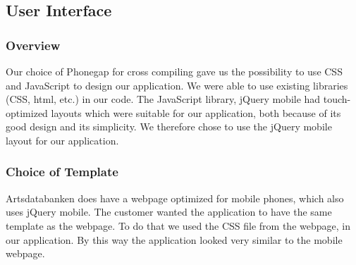 \subsection{User Interface}
	\subsubsection{Overview}
	Our choice of Phonegap for cross compiling gave us the possibility to use CSS and JavaScript to design our application. We were able to use existing libraries (CSS, html, etc.) in our code. The JavaScript library, jQuery mobile had touch-optimized layouts which were suitable for our application, both because of its good design and its simplicity. We therefore chose to use the jQuery mobile layout for our application.

\subsubsection{Choice of Template}
Artsdatabanken does have a webpage optimized for mobile phones, which also uses jQuery mobile. The customer wanted the application to have the same template as the webpage. To do that we used the CSS file from the webpage, in our application. By this way the application looked very similar to the mobile webpage.
